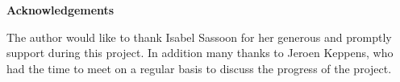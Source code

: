 \mbox{}\newline\vspace{10mm} \mbox{}\LARGE
%
{\bf Acknowledgements} \normalsize \vspace{5mm}

The author would like to thank Isabel Sassoon for her generous and promptly support during this project. In addition many thanks to Jeroen Keppens, who had the time to meet on a regular basis to discuss the progress of the project.